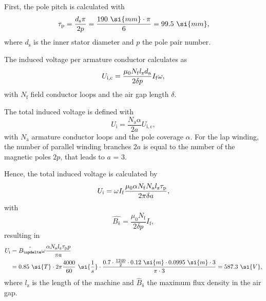 \begin{solutionblock}
    First, the pole pitch is calculated with
    \begin{equation}
        \taup = \frac{d_{\mathrm{s}} \pi}{2 p}
        = \frac{190 \ \si{mm} \cdot \pi}{6}
        = 99.5 \ \si{mm},
    \end{equation}
    where $d_{\mathrm{s}}$ is the inner stator diameter and $p$ the pole pair number.

    The induced voltage per armature conductor calculates as
    \begin{equation}
        U_{\mathrm{i,c}} = \frac{\mu_{\mathrm{0}} N_{\mathrm{f}} l_{\mathrm{z}} d_{\mathrm{a}}}{2 \delta p} I_{\mathrm{f}} \omega,
    \end{equation}
    with $N_{\mathrm{f}}$ field conductor loops and the air gap length $\delta$.

    The total induced voltage is defined with
    \begin{equation}
        U_{\mathrm{i}} = \frac{N_{\mathrm{a}} \alpha}{2a} U_{\mathrm{i,c}},
    \end{equation}
    with $N_{\mathrm{a}}$ armature conductor loops and the pole coverage $\alpha$.
    For the lap winding, the number of parallel winding branches $2a$ is equal to the number of the magnetic poles $2p$, that leads to $a$ = 3.
    
    Hence, the total induced voltage is calculated by
    \begin{equation}
        U_{\mathrm{i}} = \omega I_{\mathrm{f}} \frac{\mu_{\mathrm{0}} \alpha N_{\mathrm{f}} N_{\mathrm{a}} l_{\mathrm{z}} \tau_{\mathrm{p}}}{2 \pi \delta a},
    \end{equation}
    with
    \begin{equation}
        \hat{B_{\updelta}} = \frac{\mu_{\mathrm{0}} N_{\mathrm{f}}}{2 \delta p} I_{\mathrm{f}},
        \label{eq:B_hat_task1}
    \end{equation}
    resulting in
    \begin{align}
        \begin{split}
            U_{\mathrm{i}} &= \hat{B_{\updelta}} \omega \frac{\alpha N_{\mathrm{a}} \lz \taup p}{\pi a}\\
            &= 0.85 \ \si{T} \cdot 2\pi \frac{4000}{60} \ \si{\frac{1}{s}} \cdot \frac{0.7 \cdot \frac{1240}{2} \cdot 0.12 \ \si{m} \cdot 0.0995 \ \si{m} \cdot 3}{\pi \cdot 3}
            = 587.3 \ \si{V},
        \end{split}
    \end{align}
    where $l_{\mathrm{z}}$ is the length of the machine and $\hat{B}_{\updelta}$ the maximum flux density in the air gap.
    

\end{solutionblock}





